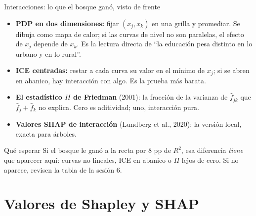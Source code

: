 \documentclass{beamer}
\newcommand{\1}{\mathbb{I}}
\begin{document}
\begin{frame}{Interacciones: lo que el bosque ganó, visto de frente}
\small
\begin{itemize}\itemsep4pt
  \item \textbf{PDP en dos dimensiones:} fijar $(x_j, x_k)$ en una grilla y promediar. Se dibuja como mapa de calor; si las curvas de nivel no son paralelas, el efecto de $x_j$ depende de $x_k$. Es la lectura directa de ``la educación pesa distinto en lo urbano y en lo rural''. \pause
  \item \textbf{ICE centradas:} restar a cada curva su valor en el mínimo de $x_j$; si se abren en abanico, hay interacción con algo. Es la prueba más barata. \pause
  \item \textbf{El estadístico $H$ de Friedman} (2001): la fracción de la varianza de $\hat{f}_{jk}$ que $\hat{f}_j + \hat{f}_k$ no explica. Cero es aditividad; uno, interacción pura. \pause
  \item \textbf{Valores SHAP de interacción} (Lundberg et al., 2020): la versión local, exacta para árboles.
\end{itemize}
\pause
\begin{block}{Qué esperar}
Si el bosque le ganó a la recta por 8 pp de $R^2$, esa diferencia \emph{tiene} que aparecer aquí: curvas no lineales, ICE en abanico o $H$ lejos de cero. Si no aparece, revisen la tabla de la sesión 6.
\end{block}
\end{frame}


\section{Valores de Shapley y SHAP}
\begin{frame}[noframenumbering]
\tableofcontents[currentsection]
\end{frame}
\end{document}
